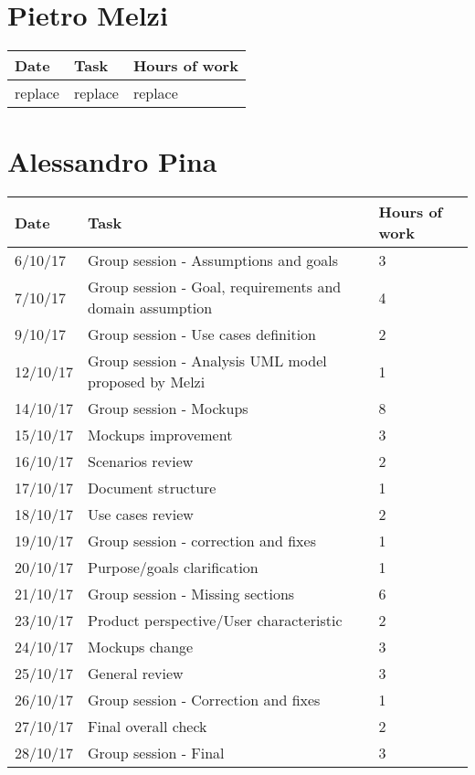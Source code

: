 \section{Pietro Melzi}
\begin{table}[H]
	\begin{tabular}{ p{2cm} p{8cm} p{3cm}}
	Date & Task & Hours of work\\
	\hline
	replace  & replace & replace \\
	\end{tabular}
\end{table}

\section{Alessandro Pina}
\begin{table}[H]
	\begin{tabular}{ p{2cm} p{8cm} p{3cm}}
	Date & Task & Hours of work\\
	\hline
	6/10/17  & Group session - Assumptions and goals & 3 \\
	7/10/17  & Group session - Goal, requirements and domain assumption & 4 \\
	9/10/17  & Group session - Use cases definition & 2 \\
	12/10/17  & Group session - Analysis UML model proposed by Melzi & 1 \\
	14/10/17  & Group session - Mockups & 8 \\
	15/10/17  & Mockups improvement & 3 \\
	16/10/17  & Scenarios review & 2 \\
	17/10/17  & Document structure & 1  \\
	18/10/17  & Use cases review & 2 \\
	19/10/17  & Group session - correction and fixes & 1 \\
	20/10/17  & Purpose/goals clarification & 1 \\
	21/10/17  & Group session - Missing sections & 6 \\
	23/10/17  & Product perspective/User characteristic & 2 \\
	24/10/17  & Mockups change & 3 \\
	25/10/17  & General review & 3 \\
	26/10/17  & Group session - Correction and fixes & 1 \\
	27/10/17  & Final overall check & 2 \\
	28/10/17  & Group session - Final  & 3 \\
	\end{tabular}
\end{table}

